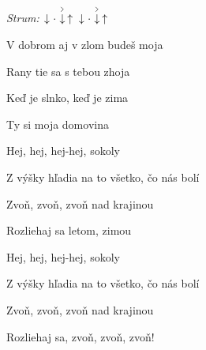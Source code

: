 \begin{song}


\begin{strumbox}
\textit{Strum:} $\Down\Miss\AccentDown\Up\ \Down\Miss\AccentDown\Up$
\end{strumbox}

\begin{chordbox}
\vspace{2em}
 \par
{} \par
{} \par
{} \par
{} \par
{} \par
{} \par
\end{chordbox}

\bigskip

 \par
{} V dobrom aj v zlom budeš moja \par
{} Rany tie sa s tebou zhoja \par
{}Keď je slnko, keď je zima \par
{}Ty si moja domovina \par

\bigskip

\begin{chorusbox}{\Refren}
Hej, hej, hej-hej, sokoly \par
{}Z výšky hľadia na to všetko, čo nás bolí \par
{}Zvoň, zvoň, zvoň nad krajinou \par
{}Rozliehaj sa letom, zimou \par

\bigskip

Hej, hej, hej-hej, sokoly \par
{}Z výšky hľadia na to všetko, čo nás bolí \par
{}Zvoň, zvoň, zvoň nad krajinou \par
{}Rozliehaj sa, zvoň, zvoň, zvoň! \par
\end{chorusbox}


\end{song}
